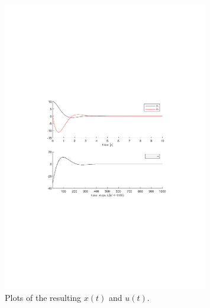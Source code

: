 \begin{figure}[h]
    \centering
    \includegraphics[width=0.8\textwidth]{2_1.pdf}
    \caption{Plots of the resulting $x(t)$ and $u(t)$.}
\end{figure}

